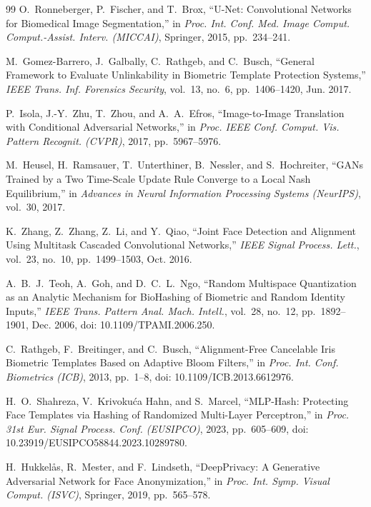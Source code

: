 \documentclass[oneside,a4paper,12pt]{extarticle}
\begin{document}
\begin{thebibliography}{99}
O.~Ronneberger, P.~Fischer, and T.~Brox, ``U-Net: Convolutional Networks for Biomedical Image Segmentation,'' in \textit{Proc. Int. Conf. Med. Image Comput. Comput.-Assist. Interv. (MICCAI)}, Springer, 2015, pp.~234--241.

M.~Gomez-Barrero, J.~Galbally, C.~Rathgeb, and C.~Busch, ``General Framework to Evaluate Unlinkability in Biometric Template Protection Systems,'' \textit{IEEE Trans. Inf. Forensics Security}, vol.~13, no.~6, pp.~1406--1420, Jun. 2017.

P.~Isola, J.-Y.~Zhu, T.~Zhou, and A.~A.~Efros, ``Image-to-Image Translation with Conditional Adversarial Networks,'' in \textit{Proc. IEEE Conf. Comput. Vis. Pattern Recognit. (CVPR)}, 2017, pp.~5967--5976.

M.~Heusel, H.~Ramsauer, T.~Unterthiner, B.~Nessler, and S.~Hochreiter, ``GANs Trained by a Two Time-Scale Update Rule Converge to a Local Nash Equilibrium,'' in \textit{Advances in Neural Information Processing Systems (NeurIPS)}, vol.~30, 2017.

K.~Zhang, Z.~Zhang, Z.~Li, and Y.~Qiao, ``Joint Face Detection and Alignment Using Multitask Cascaded Convolutional Networks,'' \textit{IEEE Signal Process. Lett.}, vol.~23, no.~10, pp.~1499--1503, Oct. 2016.

A.~B.~J.~Teoh, A.~Goh, and D.~C.~L.~Ngo, ``Random Multispace Quantization as an Analytic Mechanism for BioHashing of Biometric and Random Identity Inputs,'' \textit{IEEE Trans. Pattern Anal. Mach. Intell.}, vol.~28, no.~12, pp.~1892--1901, Dec. 2006, doi: 10.1109/TPAMI.2006.250.

C.~Rathgeb, F.~Breitinger, and C.~Busch, ``Alignment-Free Cancelable Iris Biometric Templates Based on Adaptive Bloom Filters,'' in \textit{Proc. Int. Conf. Biometrics (ICB)}, 2013, pp.~1--8, doi: 10.1109/ICB.2013.6612976.

H.~O.~Shahreza, V.~Krivoku{\'c}a Hahn, and S.~Marcel, ``MLP-Hash: Protecting Face Templates via Hashing of Randomized Multi-Layer Perceptron,'' in \textit{Proc. 31st Eur. Signal Process. Conf. (EUSIPCO)}, 2023, pp.~605--609, doi: 10.23919/EUSIPCO58844.2023.10289780.

H.~Hukkel{\r{a}}s, R.~Mester, and F.~Lindseth, ``DeepPrivacy: A Generative Adversarial Network for Face Anonymization,'' in \textit{Proc. Int. Symp. Visual Comput. (ISVC)}, Springer, 2019, pp.~565--578.


\end{thebibliography}
\end{document}
